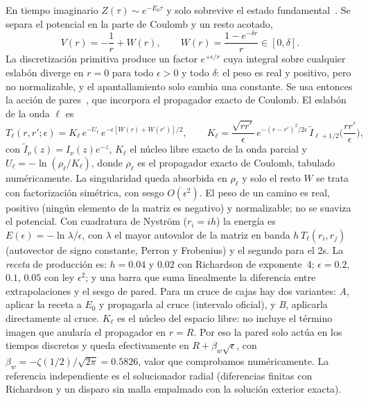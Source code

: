 \documentclass[10pt,letterpaper]{article}
\begin{document}
En tiempo imaginario $Z(\tau)\sim e^{-E_0\tau}$ y solo sobrevive el estado fundamental~\cite{FeynmanHibbs1965}. Se separa el potencial en la parte de Coulomb y un resto acotado,
\begin{equation}
V(r)=-\frac1r+W(r),\qquad W(r)=\frac{1-e^{-\delta r}}{r}\in[0,\delta].\label{eq:W}
\end{equation}
La discretización primitiva produce un factor $e^{+\epsilon/r}$ cuya integral sobre cualquier eslabón diverge en $r=0$ para todo $\epsilon>0$ y todo $\delta$: el peso es real y positivo, pero no normalizable, y el apantallamiento solo cambia una constante. Se usa entonces la acción de pares~\cite{PollockCeperley1984,Ceperley1995}, que incorpora el propagador exacto de Coulomb. El eslabón de la onda $\ell$ es
\begin{equation}
T_\ell(r,r';\epsilon)=K_\ell\,e^{-U_\ell}\,e^{-\epsilon[W(r)+W(r')]/2},\qquad
K_\ell=\frac{\sqrt{rr'}}{\epsilon}\,e^{-(r-r')^2/2\epsilon}\,\tilde I_{\ell+1/2}\Big(\frac{rr'}{\epsilon}\Big),\label{eq:T}
\end{equation}
con $\tilde I_\nu(z)=I_\nu(z)e^{-z}$, $K_\ell$ el núcleo libre exacto de la onda parcial y $U_\ell=-\ln(\rho_\ell/K_\ell)$, donde $\rho_\ell$ es el propagador exacto de Coulomb, tabulado numéricamente. La singularidad queda absorbida en $\rho_\ell$ y solo el resto $W$ se trata con factorización simétrica, con sesgo $O(\epsilon^2)$. El peso de un camino es real, positivo (ningún elemento de la matriz es negativo) y normalizable; no se suaviza el potencial. Con cuadratura de Nyström ($r_i=ih$) la energía es $E(\epsilon)=-\ln\lambda/\epsilon$, con $\lambda$ el mayor autovalor de la matriz en banda $h\,T_\ell(r_i,r_j)$ (autovector de signo constante, Perron y Frobenius) y el segundo para el 2s. La \emph{receta} de producción es: $h=0.04$ y $0.02$ con Richardson de exponente~4; $\epsilon=0.2$, $0.1$, $0.05$ con ley $\epsilon^2$; y una barra que suma linealmente la diferencia entre extrapolaciones y el sesgo de pared. Para un cruce de cajas hay dos variantes: \emph{A}, aplicar la receta a $E_0$ y propagarla al cruce (intervalo oficial), y \emph{B}, aplicarla directamente al cruce. $K_\ell$ es el núcleo del espacio libre: no incluye el término imagen que anularía el propagador en $r=R$. Por eso la pared solo actúa en los tiempos discretos y queda efectivamente en $R+\beta_w\sqrt\epsilon$, con $\beta_w=-\zeta(1/2)/\sqrt{2\pi}=0.5826$, valor que comprobamos numéricamente. La referencia independiente es el solucionador radial (diferencias finitas con Richardson y un disparo sin malla empalmado con la solución exterior exacta).
\end{document}
